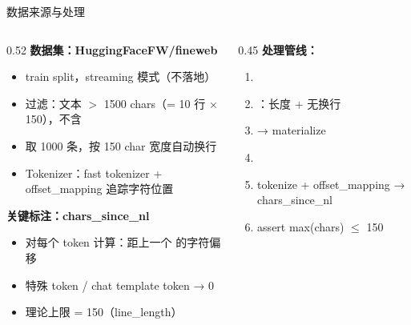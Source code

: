 \begin{frame}{数据来源与处理}
\small
\begin{columns}[T,onlytextwidth]
\begin{column}{0.52\linewidth}
\textbf{数据集：HuggingFaceFW/fineweb}
\begin{itemize}
  \item train split，streaming 模式（不落地）
  \item 过滤：文本 $>$ 1500 chars（= 10 行 × 150），不含 \code{\\n}
  \item 取 1000 条，按 150 char 宽度自动换行
  \item Tokenizer：fast tokenizer + offset\_mapping 追踪字符位置
\end{itemize}

\vspace{0.4em}
\textbf{关键标注：chars\_since\_nl}
\begin{itemize}
  \item 对每个 token 计算：距上一个 \code{\\n} 的字符偏移
  \item 特殊 token / chat template token → 0
  \item 理论上限 = 150（line\_length）
\end{itemize}
\end{column}
\begin{column}{0.45\linewidth}
\textbf{处理管线：}
\begin{enumerate}
  \item {}
  \item {}：长度 + 无换行
  \item {} → materialize
  \item {}
  \item tokenize + offset\_mapping → chars\_since\_nl
  \item assert max(chars) $\le$ 150
\end{enumerate}
\end{column}
\end{columns}
\end{frame}

